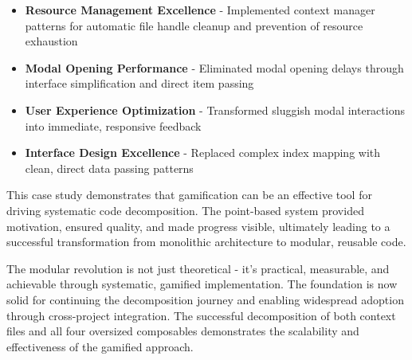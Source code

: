 \documentclass[11pt]{article}
\begin{document}
\begin{itemize}
\item \textbf{Resource Management Excellence} - Implemented context manager patterns for automatic file handle cleanup and prevention of resource exhaustion
\item \textbf{Modal Opening Performance} - Eliminated modal opening delays through interface simplification and direct item passing
\item \textbf{User Experience Optimization} - Transformed sluggish modal interactions into immediate, responsive feedback
\item \textbf{Interface Design Excellence} - Replaced complex index mapping with clean, direct data passing patterns
\end{itemize}

This case study demonstrates that gamification can be an effective tool for driving systematic code decomposition. The point-based system provided motivation, ensured quality, and made progress visible, ultimately leading to a successful transformation from monolithic architecture to modular, reusable code.

The modular revolution is not just theoretical - it's practical, measurable, and achievable through systematic, gamified implementation. The foundation is now solid for continuing the decomposition journey and enabling widespread adoption through cross-project integration. The successful decomposition of both context files and all four oversized composables demonstrates the scalability and effectiveness of the gamified approach.
\end{document}
